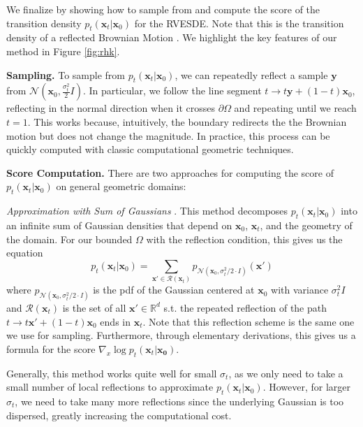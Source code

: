 \documentclass{article}
\theoremstyle{plain}
\theoremstyle{definition}
\theoremstyle{remark}
\newcommand{\R}{\mathbb{R}}
\newcommand{\paren}[1]{\left(#1\right)}
\newcommand{\grad}{\nabla}
\renewcommand{\vec}{\mathbf}
\begin{document}
We finalize by showing how to sample from and compute the score of the transition density $p_t(\vec{x}_t | \vec{x}_0)$ for the RVESDE. Note that this is the transition density of a reflected Brownian Motion \citep{Harrison1981ReflectedBM}. We highlight the key features of our method in Figure \ref{fig:rhk}.

\textbf{Sampling.} To sample from $p_t(\vec{x}_t | \vec{x}_0)$, we can repeatedly reflect a sample $\vec{y}$ from $\mathcal{N}(\vec{x}_0, \frac{\sigma_t^2}{2} I)$. In particular, we follow the line segment $t \to t\vec{y} + (1 - t)\vec{x}_0$, reflecting in the normal direction when it crosses $\partial \Omega$ and repeating until we reach $t = 1$. This works because, intuitively, the boundary redirects the the Brownian motion but does not change the magnitude. In practice, this process can be quickly computed with classic computational geometric techniques.

\textbf{Score Computation.} There are two approaches for computing the score of $p_t(\vec{x}_t | \vec{x}_0)$ on general geometric domains:

\textit{Approximation with Sum of Gaussians} \citep{Jing2022TorsionalDF}. This method decomposes $p_t(\vec{x}_t | \vec{x}_0)$ into an infinite sum of Gaussian densities that depend on $\vec{x}_0$, $\vec{x}_t$, and the geometry of the domain. For our bounded $\Omega$ with the reflection condition, this gives us the equation
\begin{equation}
    p_t(\vec{x}_t | \vec{x}_0) = \sum_{\vec{x}' \in \mathcal{R}(\vec{x}_t)} p_{\mathcal{N}\paren{\vec{x}_0, \sigma_t^2/2 \cdot I}}(\vec{x}')
\end{equation}
where $p_{\mathcal{N}\paren{\vec{x}_0, \sigma_t^2/2 \cdot I}}$ is the pdf of the Gaussian centered at $\vec{x}_0$ with variance $\sigma_t^2 I$ and $\mathcal{R}(\vec{x}_t)$ is the set of all $\vec{x}' \in \R^d$ s.t. the repeated reflection of the path $t \to t\vec{x}' + (1 - t)\vec{x}_0$ ends in $\vec{x}_t$. Note that this reflection scheme is the same one we use for sampling. Furthermore, through elementary derivations, this gives us a formula for the score $\grad_x \log p_t(\vec{x}_t | \vec{x_0})$.

Generally, this method works quite well for small $\sigma_t$, as we only need to take a small number of local reflections to approximate $p_t(\vec{x}_t | \vec{x}_0)$. However, for larger $\sigma_t$, we need to take many more reflections since the underlying Gaussian is too dispersed, greatly increasing the computational cost.
\end{document}

